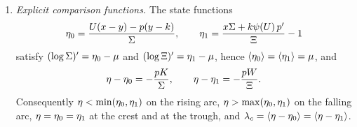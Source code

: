 \begin{theorem}
\begin{enumerate}[label=(\roman*)]
\begin{equation}
\Sg_c'=(\eta-\mu)\Sg_c+p\,(K+c\,\zeta),\qquad
\lambda_c=-\avg{\frac{p\,(K+c\,\zeta)}{\Sg_c}},
\end{equation}
and the conclusions of \textup{(ii)} hold for rays from $(-c,0)$.
\item \emph{Explicit comparison functions.} The state functions
\begin{equation}\label{gau:etazero}
\eta_0=\frac{U(x-y)-p(y-k)}{\Sigma},\qquad
\eta_1=\frac{x\Sigma+k\psi(U)\,p'}{\Xi}-1
\end{equation}
satisfy $(\log\Sigma)'=\eta_0-\mu$ and $(\log\Xi)'=\eta_1-\mu$, hence $\left\langle \eta_0\right\rangle=\left\langle \eta_1\right\rangle=\mu$, and
\begin{equation}\label{gau:etadifference}
\eta-\eta_0=-\frac{pK}{\Sigma},\qquad \eta-\eta_1=-\frac{pW}{\Xi}.
\end{equation}
Consequently $\eta<\min(\eta_0,\eta_1)$ on the rising arc, $\eta>\max(\eta_0,\eta_1)$ on the falling arc, $\eta=\eta_0=\eta_1$ at the crest and at the trough, and $\lambda_c=\left\langle \eta-\eta_0\right\rangle=\left\langle \eta-\eta_1\right\rangle$.
\end{enumerate}
\end{theorem}
